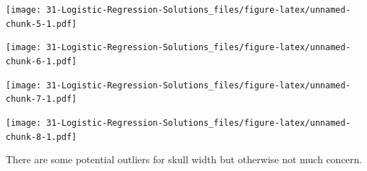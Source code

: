 \documentclass[
]{book}
\newenvironment{Shaded}{\begin{snugshade}}{\end{snugshade}}
\newcommand{\KeywordTok}[1]{\textcolor[rgb]{0.13,0.29,0.53}{\textbf{#1}}}
\newcommand{\NormalTok}[1]{#1}
\newcommand{\OperatorTok}[1]{\textcolor[rgb]{0.81,0.36,0.00}{\textbf{#1}}}
\newcommand{\StringTok}[1]{\textcolor[rgb]{0.31,0.60,0.02}{#1}}
\begin{document}
\begin{Shaded}
\end{Shaded}

\texttt{[image: 31-Logistic-Regression-Solutions\_files/figure-latex/unnamed-chunk-5-1.pdf]}

\begin{Shaded}
\end{Shaded}

\texttt{[image: 31-Logistic-Regression-Solutions\_files/figure-latex/unnamed-chunk-6-1.pdf]}

\begin{Shaded}
\end{Shaded}

\texttt{[image: 31-Logistic-Regression-Solutions\_files/figure-latex/unnamed-chunk-7-1.pdf]}

\begin{Shaded}
\end{Shaded}

\texttt{[image: 31-Logistic-Regression-Solutions\_files/figure-latex/unnamed-chunk-8-1.pdf]}

There are some potential outliers for skull width but otherwise not much concern.
\end{document}
